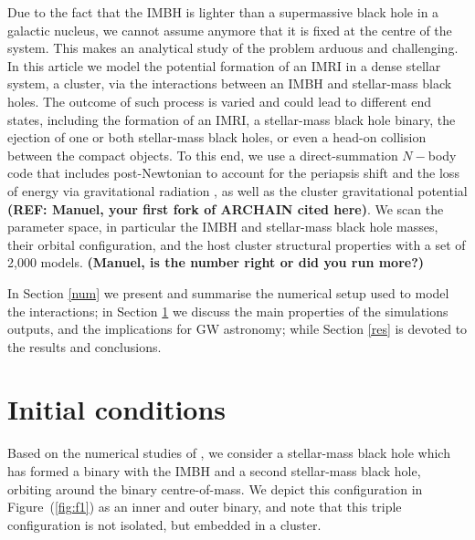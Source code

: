 \documentclass[useAMS,usenatbib]{mn2e}
\begin{document}
Due to the fact that the IMBH is lighter than a supermassive black hole in a
galactic nucleus, we cannot assume anymore that it is fixed at the centre of
the system. This makes an analytical study of the problem arduous and
challenging.  In this article we model the potential formation of an IMRI in a
dense stellar system, a cluster, via the interactions between an IMBH and
stellar-mass black holes. The outcome of such process is varied and could lead
to different end states, including the formation of an IMRI, a stellar-mass
black hole binary, the ejection of one or both stellar-mass black holes, or
even a head-on collision between the compact objects.  To this end, we use a
direct-summation $N-$body code that includes post-Newtonian to account for the
periapsis shift and the loss of energy via gravitational radiation \citep[as
presented for the first time in][]{KupiEtAl06}, as well as the cluster
gravitational potential \textbf{(REF: Manuel, your first fork of ARCHAIN cited
here)}. We scan the parameter space, in particular the IMBH and stellar-mass
black hole masses, their orbital configuration, and the host cluster structural
properties with a set of 2,000 models. \textbf{(Manuel, is the number right or did
you run more?)}

In Section \ref{num} we present and summarise the numerical setup used to model
the interactions; in Section \ref{met} we discuss the main properties of the
simulations outputs, and the implications for GW astronomy; while Section
\ref{res} is devoted to the results and conclusions. 

\section{Initial conditions} \label{met}

Based on the numerical studies of
\cite{konstantinidis13,leigh14,MacLeodEtAl2016,haster16}, we consider a
stellar-mass black hole which has formed a binary with the IMBH and a second
stellar-mass black hole, orbiting around the binary centre-of-mass. We depict
this configuration in Figure~(\ref{fig:f1}) as an inner and outer binary, and
note that this triple configuration is not isolated, but embedded in a cluster.
\end{document}
